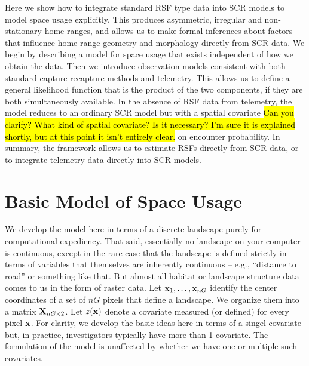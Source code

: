 Here we show how to integrate standard RSF type data into SCR models
to model space usage explicitly. This produces asymmetric, irregular
and non-stationary home ranges, and allows us to make formal
inferences about factors that influence home range geometry and
morphology directly from SCR data.  We begin by describing a model for
space usage that exists independent of how we obtain the data. Then we
introduce observation models consistent with both standard
capture-recapture methods and telemetry.  This allows us to define a
general likelihood function that is the product of the two
components, if they are both simultaneously available.  In the absence
of RSF data from telemetry, the model reduces to an ordinary SCR model
but with a spatial covariate
\hl{ Can you clarify? What kind of spatial covariate? Is it necessary?
I'm sure it is explained shortly, but at this point it isn't entirely clear.}
on encounter probability.  In summary,
the framework allows us to estimate RSFs directly from SCR data, or to
integrate telemetry data directly into SCR models.

\section{Basic Model of Space Usage}
\label{rsf.sec.rsfmodel}

We develop the model here in terms of a discrete landscape purely for
computational expediency. That said, essentially no landscape on your
computer is continuous, except in the rare case that the landscape is
defined strictly in terms of variables that themselves are inherently
continuous -- e.g., ``distance to road'' or something like that.  But
almost all habitat or landscape structure data comes to us in the form
of raster data.  Let ${\bf x}_{1},\ldots,{\bf x}_{nG}$ identify the center
coordinates of a set of $nG$ pixels that define a landscape.
We organize them into a matrix
${\bf X}_{nG \times 2}$.  Let $z({\bf x})$ denote a covariate measured
(or defined) for
every pixel ${\bf x}$. For clarity, we develop the basic ideas here in terms of a
singel covariate but, in practice, investigators typically have more
than 1 covariate. The formulation of the model is unaffected by
whether we have one or multiple such covariates. 

